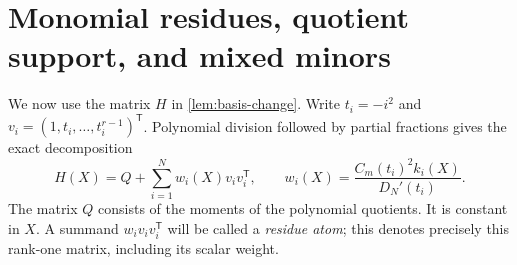 \documentclass[11pt,letterpaper]{article}
\theoremstyle{definition}
\begin{document}

\section{Monomial residues, quotient support, and mixed minors}\label{sec:monomial}

We now use the matrix $H$ in \cref{lem:basis-change}. Write
$t_i=-i^2$ and $v_i=(1,t_i,\ldots,t_i^{r-1})^{\mathsf T}$.
Polynomial division followed by partial fractions gives the exact
decomposition
\begin{equation}\label{eq:monomial-residue-decomposition}
 H(X)=Q+\sum_{i=1}^N w_i(X)v_iv_i^{\mathsf T},\qquad
 w_i(X)=\frac{C_m(t_i)^2k_i(X)}{D_N'(t_i)}.
\end{equation}
The matrix $Q$ consists of the moments of the polynomial quotients.
It is constant in $X$. A summand $w_iv_iv_i^{\mathsf T}$ will be
called a \emph{residue atom}; this denotes precisely this rank-one
matrix, including its scalar weight.
\end{document}
